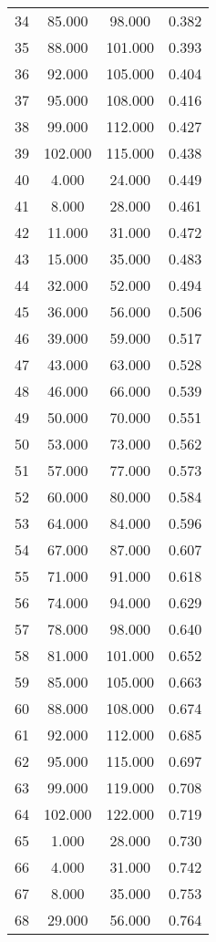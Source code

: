 \begin{tabular}{cccc}
  34 & 85.000 & 98.000 & 0.382 \\ 
  35 & 88.000 & 101.000 & 0.393 \\ 
  36 & 92.000 & 105.000 & 0.404 \\ 
  37 & 95.000 & 108.000 & 0.416 \\ 
  38 & 99.000 & 112.000 & 0.427 \\ 
  39 & 102.000 & 115.000 & 0.438 \\ 
  40 & 4.000 & 24.000 & 0.449 \\ 
  41 & 8.000 & 28.000 & 0.461 \\ 
  42 & 11.000 & 31.000 & 0.472 \\ 
  43 & 15.000 & 35.000 & 0.483 \\ 
  44 & 32.000 & 52.000 & 0.494 \\ 
  45 & 36.000 & 56.000 & 0.506 \\ 
  46 & 39.000 & 59.000 & 0.517 \\ 
  47 & 43.000 & 63.000 & 0.528 \\ 
  48 & 46.000 & 66.000 & 0.539 \\ 
  49 & 50.000 & 70.000 & 0.551 \\ 
  50 & 53.000 & 73.000 & 0.562 \\ 
  51 & 57.000 & 77.000 & 0.573 \\ 
  52 & 60.000 & 80.000 & 0.584 \\ 
  53 & 64.000 & 84.000 & 0.596 \\ 
  54 & 67.000 & 87.000 & 0.607 \\ 
  55 & 71.000 & 91.000 & 0.618 \\ 
  56 & 74.000 & 94.000 & 0.629 \\ 
  57 & 78.000 & 98.000 & 0.640 \\ 
  58 & 81.000 & 101.000 & 0.652 \\ 
  59 & 85.000 & 105.000 & 0.663 \\ 
  60 & 88.000 & 108.000 & 0.674 \\ 
  61 & 92.000 & 112.000 & 0.685 \\ 
  62 & 95.000 & 115.000 & 0.697 \\ 
  63 & 99.000 & 119.000 & 0.708 \\ 
  64 & 102.000 & 122.000 & 0.719 \\ 
  65 & 1.000 & 28.000 & 0.730 \\ 
  66 & 4.000 & 31.000 & 0.742 \\ 
  67 & 8.000 & 35.000 & 0.753 \\ 
  68 & 29.000 & 56.000 & 0.764 \\ 

\end{tabular}
